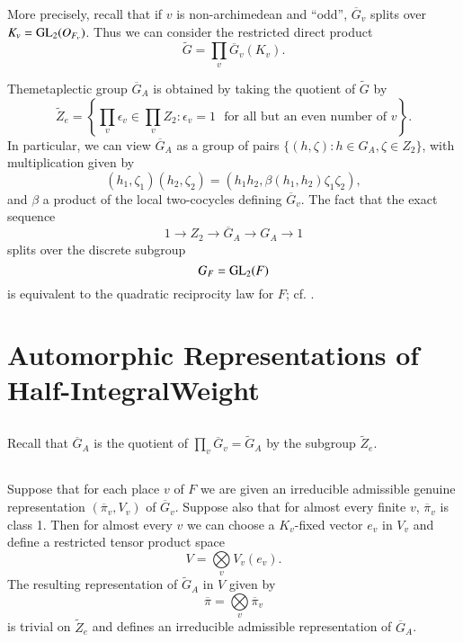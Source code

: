 More precisely, recall that if $v$ is non-archimedean and ``odd'', $\overline{G}_{v}$ splits over $K_{v}=\mathrm{GL}_{2}(O_{F_{v}})$. Thus we can consider the restricted direct product
$$
\widetilde{G}=\prod\limits_{v}\overline{G}_{v}(K_{v}).
$$

The\pageoriginale metaplectic group $\overline{G}_{A}$ is obtained by taking the quotient of $\widetilde{G}$ by
$$
\widetilde{Z}_{e}=\left\{\prod\limits_{v}\epsilon_{v}\in \prod\limits_{v}Z_{2}:\epsilon_{v}=1\text{~ for all but an even number of } v\right\}.
$$
In particular, we can view $\overline{G}_{A}$ as a group of pairs $\{(h,\zeta):h\in G_{A},\zeta\in Z_{2}\}$, with multiplication given by
$$
(h_{1},\zeta_{1})(h_{2},\zeta_{2})=(h_{1}h_{2},\beta(h_{1},h_{2})\zeta_{1}\zeta_{2}),
$$
and $\beta$ a product of the local two-cocycles defining $\overline{G}_{v}$. The fact that the exact sequence
$$
1\to Z_{2}\to \overline{G}_{A}\to G_{A}\to 1
$$
splits over the discrete subgroup
$$
G_{F}=\mathrm{GL}_{2}(F)
$$
is equivalent to the quadratic reciprocity law for $F$; cf. \cite{Weil}.

\section[Automorphic Representations of Half-Integral Weight]{Automorphic Representations of Half-Integral\break Weight}\label{art1-sec9}

\subsection{}\label{art1-sec9.1}
Recall that $\overline{G}_{A}$ is the quotient of $\prod\limits_{v}\overline{G}_{v}=\widetilde{G}_{A}$ by the subgroup $\widetilde{Z}_{e}$.

\subsection{}\label{art1-sec9.2}
Suppose that for each place $v$ of $F$ we are given an irreducible admissible genuine representation $(\overline{\pi}_{v},V_{v})$ of $\overline{G}_{v}$. Suppose also that for almost every finite $v$, $\overline{\pi}_{v}$ is class 1. Then for almost every $v$ we can choose a $K_{v}$-fixed vector $e_{v}$ in $V_{v}$ and define a restricted tensor product space 
$$
V=\bigotimes\limits_{v}V_{v}(e_{v}).
$$
The resulting representation of $\widetilde{G}_{A}$ in $V$ given by
\setcounter{equation}{0}
\begin{equation}
\overline{\pi}=\bigotimes\limits_{v}\overline{\pi}_{v}\label{art1-eq9.2.1}
\end{equation}
is trivial on $\widetilde{Z}_{e}$ and defines an irreducible admissible representation of $\overline{G}_{A}$.

